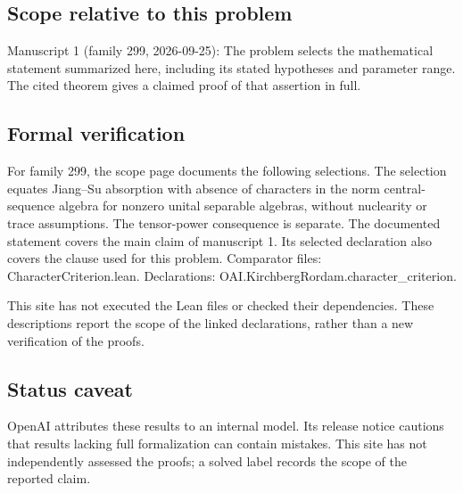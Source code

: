 \documentclass[11pt]{article}
\begin{document}
\subsection{Scope relative to this problem}
Manuscript 1 (family 299, 2026-09-25): The problem selects the mathematical statement summarized here, including its stated hypotheses and parameter range. The cited theorem gives a claimed proof of that assertion in full.

\subsection{Formal verification}
For family 299, the scope page documents the following selections. The selection equates Jiang--Su absorption with absence of characters in the norm central-sequence algebra for nonzero unital separable algebras, without nuclearity or trace assumptions. The tensor-power consequence is separate. The documented statement covers the main claim of manuscript 1. Its selected declaration also covers the clause used for this problem. Comparator files: CharacterCriterion.lean. Declarations: OAI.KirchbergRordam.character\_criterion.

This site has not executed the Lean files or checked their dependencies. These descriptions report the scope of the linked declarations, rather than a new verification of the proofs.

\subsection{Status caveat}
OpenAI attributes these results to an internal model. Its release notice cautions that results lacking full formalization can contain mistakes. This site has not independently assessed the proofs; a solved label records the scope of the reported claim.
\end{document}
